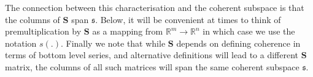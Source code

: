 \documentclass[12pt]{article}
\theoremstyle{definition}
\begin{document}
The connection between this characterisation and the coherent subspace is that the columns of $\bm{S}$ span $\mathfrak{s}$.  Below, it will be convenient at times to think of premultiplication by $\bm{S}$ as a mapping from $\mathbb{R}^m\rightarrow\mathbb{R}^n$ in which case we use the notation $s(.)$.  Finally we note that while $\bm{S}$ depends on defining coherence in terms of bottom level series, and alternative definitions will lead to a different $\bm{S}$ matrix, the columns of all such matrices will span the same coherent subspace $\mathfrak{s}$.


\end{document}
